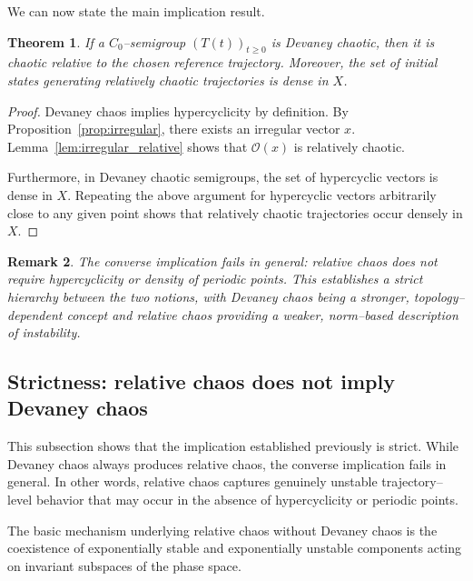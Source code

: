 \documentclass[12pt]{article}
\newtheorem{theorem}{Theorem}[section]
\newtheorem{remark}[theorem]{Remark}
\begin{document}
We can now state the main implication result.

\begin{theorem}\label{thm:devaney_relative}
If a $C_0$--semigroup $(T(t))_{t\ge 0}$ is Devaney chaotic, then it is chaotic relative to the chosen reference trajectory. Moreover, the set of initial states generating relatively chaotic trajectories is dense in $X$.
\end{theorem}

\begin{proof}
Devaney chaos implies hypercyclicity by definition. By Proposition~\ref{prop:irregular}, there exists an irregular vector $x$. Lemma~\ref{lem:irregular_relative} shows that $\mathcal{O}(x)$ is relatively chaotic.

Furthermore, in Devaney chaotic semigroups, the set of hypercyclic vectors is dense in $X$. Repeating the above argument for hypercyclic vectors arbitrarily close to any given point shows that relatively chaotic trajectories occur densely in $X$.
\end{proof}

\begin{remark}
The converse implication fails in general: relative chaos does not require hypercyclicity or density of periodic points. This
establishes a strict hierarchy between the two notions, with Devaney chaos being a stronger, topology--dependent concept and relative chaos providing a weaker, norm--based description of instability.
\end{remark}

\subsection{Strictness: relative chaos does not imply Devaney chaos}

This subsection shows that the implication established previously is strict. While Devaney chaos always produces relative chaos, the converse implication fails in general. In other words, relative chaos captures genuinely unstable trajectory--level behavior that may occur in the absence of hypercyclicity or periodic points.

The basic mechanism underlying relative chaos without Devaney chaos is the coexistence of exponentially stable and exponentially unstable components acting on invariant subspaces of the phase space.
\end{document}
